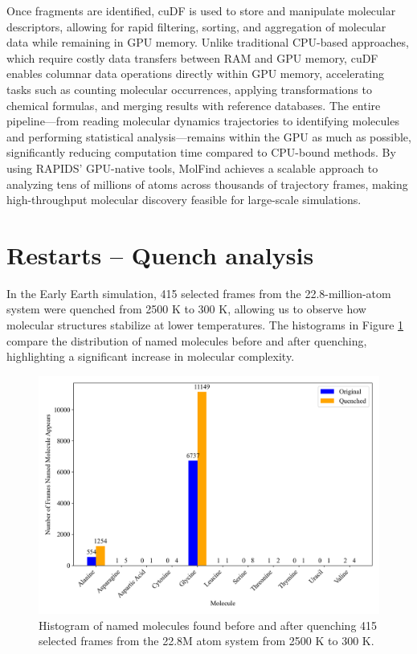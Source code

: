 Once fragments are identified, cuDF is used  to store and manipulate molecular descriptors, allowing for rapid filtering, sorting, and aggregation of molecular data while remaining in GPU memory. Unlike traditional CPU-based approaches, which require costly data transfers between RAM and GPU memory, cuDF enables columnar data operations directly within GPU memory, accelerating tasks such as counting molecular occurrences, applying transformations to chemical formulas, and merging results with reference databases. The entire pipeline—from reading molecular dynamics trajectories to identifying molecules and performing statistical analysis—remains within the GPU as much as possible, significantly reducing computation time compared to CPU-bound methods. By using RAPIDS' GPU-native tools, MolFind achieves a scalable approach to analyzing tens of millions of atoms across thousands of trajectory frames, making high-throughput molecular discovery feasible for large-scale simulations.

\section{Restarts -- Quench analysis}
\label{sec:restarts_quench_analysis}

In the Early Earth simulation, 415 selected frames from the 22.8-million-atom system were quenched from 2500 K to 300 K, allowing us to observe how molecular structures stabilize at lower temperatures. The histograms in Figure \ref{fig:ee_quench_hist} compare the distribution of named molecules before and after quenching, highlighting a significant increase in molecular complexity. 

\begin{figure}[!h]
    \centering
    \includegraphics[width=1\linewidth]{Images/early_earth/hist-before-after-quench.png}
    \caption[Histogram: molecules found before and after quenching system]{Histogram of named molecules found before and after quenching 415 selected frames from the 22.8M atom system from 2500 K to 300 K.}
    \label{fig:ee_quench_hist}
\end{figure}

